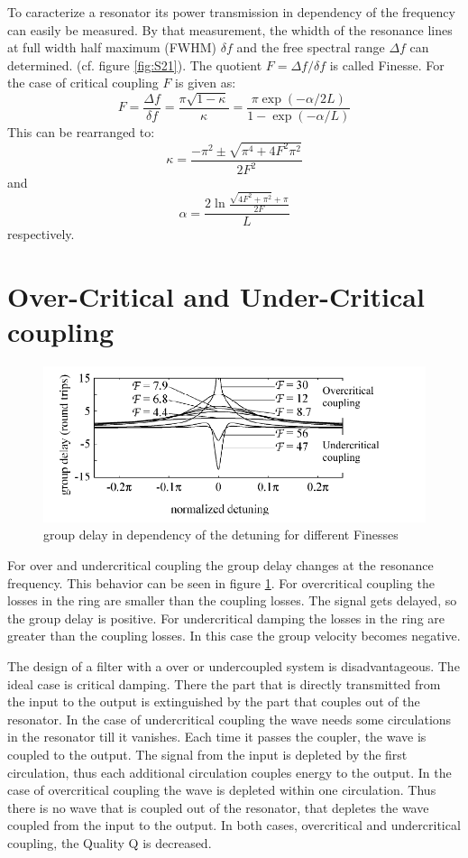 To caracterize a resonator its power transmission in dependency of the frequency can easily be measured. By that measurement, the whidth of the resonance lines at full width half maximum (FWHM) $\delta f$ and the free spectral range $\Delta f$ can determined. (cf. figure \ref{fig:S21}). The quotient $F= \Delta f/\delta f$ is called Finesse. For the case of critical coupling $F$ is given as:
\begin{equation}
 F = \frac{\Delta f}{\delta f} = \frac{\pi\sqrt{1-\kappa}}{\kappa}=\frac{\pi\exp\left(-\alpha/2L\right)}{1-\exp\left(-\alpha/L\right)}
\end{equation}
This can be rearranged to:
\begin{equation}
 \kappa = \frac{-\pi^2 \pm \sqrt{\pi^4+4F^2\pi^2}}{2F^2}
\end{equation}
and
\begin{equation}
\alpha = \frac{2\ln\frac{\sqrt{4F^2+\pi^2}+\pi}{2F}}{L} 
\end{equation}
respectively.

\section{Over-Critical and Under-Critical coupling}

\begin{figure}[h]%
\centering
\includegraphics[width=.7\columnwidth]{Grafiken/crit_coupling.pdf}%
\caption{group delay in dependency of the detuning for different Finesses}%
\label{fig:crit_coupling}%
\end{figure}

For over and undercritical coupling the group delay changes at the resonance frequency. This behavior can be seen in figure \ref{fig:crit_coupling}. For overcritical coupling the losses in the ring are smaller than the coupling losses. The signal gets delayed, so the group delay is positive. For undercritical damping the losses in the ring are greater than the coupling losses. In this case the group velocity becomes negative.

The design of a filter with a over or undercoupled system is disadvantageous. The ideal case is critical damping. There the part that is directly transmitted from the input to the output is extinguished by the part that couples out of the resonator. In the case of undercritical coupling the wave needs some circulations in the resonator till it vanishes. Each time it passes the coupler, the wave is coupled to the output. The signal from the input is depleted by the first circulation, thus each additional circulation couples energy to the output.
In the case of overcritical coupling the wave is depleted within one circulation. Thus there is no wave that is coupled out of the resonator, that depletes the wave coupled from the input to the output.
In both cases, overcritical and undercritical coupling, the Quality Q is decreased.